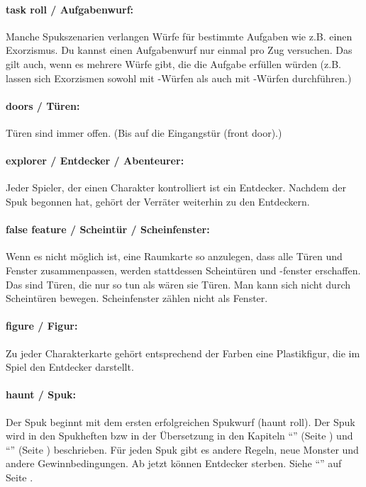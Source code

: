 \paragraph{task roll / Aufgabenwurf:} Manche Spukszenarien verlangen Würfe für bestimmte Aufgaben wie z.B. einen Exorzismus. Du kannst einen Aufgabenwurf nur einmal pro Zug versuchen. Das gilt auch, wenn es mehrere Würfe gibt, die die Aufgabe erfüllen würden (z.B. lassen sich Exorzismen sowohl mit \sanity-Würfen als auch mit \know-Würfen durchführen.)

\paragraph{doors / Türen:} Türen sind immer offen. (Bis auf die Eingangstür (front door).)

\paragraph{explorer / Entdecker / Abenteurer:} Jeder Spieler, der einen Charakter kontrolliert ist ein Entdecker. Nachdem der Spuk begonnen hat, gehört der Verräter weiterhin zu den Entdeckern.

\paragraph{false feature / Scheintür / Scheinfenster:} Wenn es nicht möglich ist, eine Raumkarte so anzulegen, dass alle Türen und Fenster zusammenpassen, werden stattdessen Scheintüren und -fenster erschaffen. Das sind Türen, die nur so tun als wären sie Türen. Man kann sich nicht durch Scheintüren bewegen. Scheinfenster zählen nicht als Fenster.

\paragraph{figure / Figur:} Zu jeder Charakterkarte gehört entsprechend der Farben eine Plastikfigur, die im Spiel den Entdecker darstellt.

\paragraph{haunt / Spuk:} Der Spuk beginnt mit dem ersten erfolgreichen Spukwurf (haunt roll). Der Spuk wird in den Spukheften bzw in der Übersetzung in den Kapiteln ``'' (Seite \pageref{kap:sos}) und ``'' (Seite \pageref{kap:tt}) beschrieben. Für jeden Spuk gibt es andere Regeln, neue Monster und andere Gewinnbedingungen. Ab jetzt können Entdecker sterben. Siehe ``'' auf Seite \pageref{kap:rule:haunt}.

